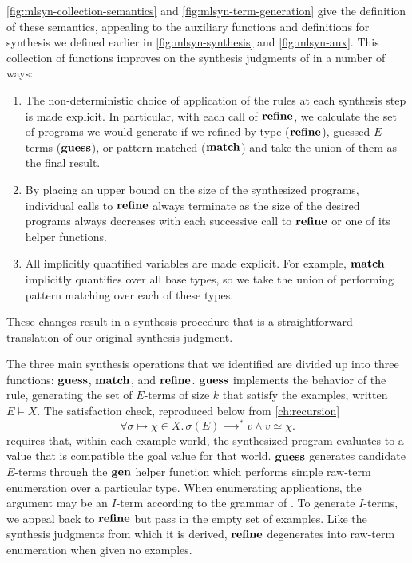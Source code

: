 \autoref{fig:mlsyn-collection-semantics} and \autoref{fig:mlsyn-term-generation} give the definition of these semantics, appealing to the auxiliary functions and definitions for synthesis we defined earlier in \autoref{fig:mlsyn-synthesis} and \autoref{fig:mlsyn-aux}.
This collection of functions improves on the synthesis judgments of \mlsyn{} in a number of ways:
\begin{enumerate}
  \item The non-deterministic choice of application of the rules at each synthesis step is made explicit.
    In particular, with each call of $\mathbf{refine}$, we calculate the set of programs we would generate if we refined by type ($\mathbf{refine}$), guessed $E$-terms ($\mathbf{guess}$), or pattern matched ($\mathbf{match}$) and take the union of them as the final result.
  \item By placing an upper bound on the size of the synthesized programs, individual calls to $\mathbf{refine}$ always terminate as the size of the desired programs always decreases with each successive call to $\mathbf{refine}$ or one of its helper functions.
  \item All implicitly quantified variables are made explicit.
    For example, $\mathbf{match}$ implicitly quantifies over all base types, so we take the union of performing pattern matching over each of these types.
\end{enumerate}
These changes result in a synthesis procedure that is a straightforward translation of our original synthesis judgment.

The three main synthesis operations that we identified are divided up into three functions: $\mathbf{guess}$, $\mathbf{match}$, and $\mathbf{refine}$.
$\mathbf{guess}$ implements the behavior of the  rule, generating the set of $E$-terms of size $k$ that satisfy the examples, written $E ⊨ Χ$.
The satisfaction check, reproduced below from \autoref{ch:recursion}
\[
  ∀σ ↦ χ ∈ Χ.\, σ(E) ⟶^* v ∧ v ≃ χ.
\]
requires that, within each example world, the synthesized program evaluates to a value that is compatible the goal value for that world.
$\mathbf{guess}$ generates candidate $E$-terms through the $\mathbf{gen}$ helper function which performs simple raw-term enumeration over a particular type.
When enumerating applications, the argument may be an $I$-term according to the grammar of \mlsyn{}.
To generate $I$-terms, we appeal back to $\mathbf{refine}$ but pass in the empty set of examples.
Like the synthesis judgments from which it is derived, $\mathbf{refine}$ degenerates into raw-term enumeration when given no examples.

